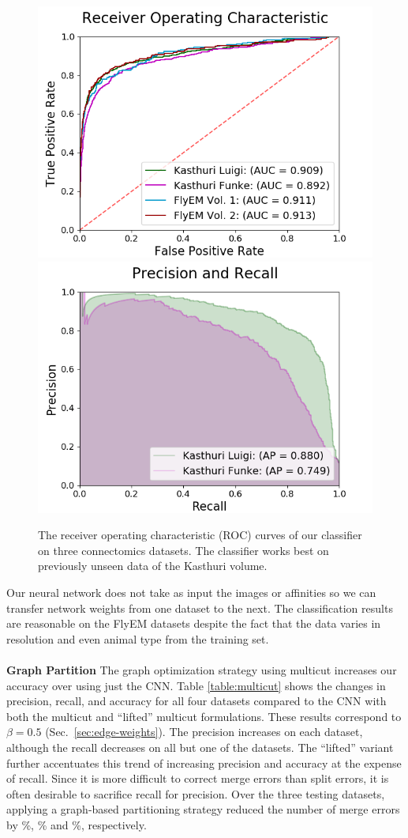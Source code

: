 \begin{figure}
	\centering
	\includegraphics[width=0.45\linewidth]{./figures/receiver-operating-characteristic.png}		\includegraphics[width=0.45\linewidth]{./figures/precision-and-recall.png}
	\caption{The receiver operating characteristic (ROC) curves of our classifier on three connectomics datasets. The classifier works best on previously unseen data of the Kasthuri volume.}
	\label{fig:receiver-operating-characteristic}
\end{figure}

Our neural network does not take as input the images or affinities so we can transfer network weights from one dataset to the next.
The classification results are reasonable on the FlyEM datasets despite the fact that the data varies in resolution and even animal type from the training set.
\\~\\
\noindent\textbf{Graph Partition}
The graph optimization strategy using multicut increases our accuracy over using just the CNN.
Table \ref{table:multicut} shows the changes in precision, recall, and accuracy for all four datasets compared to the CNN with both the multicut and ``lifted'' multicut formulations.
These results correspond to $\beta = 0.5$ (Sec.~\ref{sec:edge-weights}). 
The precision increases on each dataset, although the recall decreases on all but one of the datasets.
The ``lifted'' variant further accentuates this trend of increasing precision and accuracy at the expense of recall. 
Since it is more difficult to correct merge errors than split errors, it is often desirable to sacrifice recall for precision.
Over the three testing datasets, applying a graph-based partitioning strategy reduced the number of merge errors by \%, \% and \%, respectively. 


